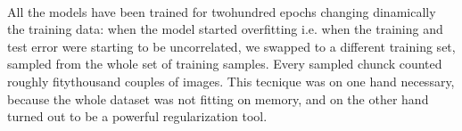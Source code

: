 \\
All the models have been trained for twohundred epochs changing dinamically the training data: when the model started overfitting i.e. when the training and test error were starting to be uncorrelated, we swapped to a different training set, sampled from the whole set of training samples. Every sampled chunck counted roughly fitythousand couples of images. This tecnique was on one hand necessary, because the whole dataset was not fitting on memory, and on the other hand turned out to be a powerful regularization tool.

%


